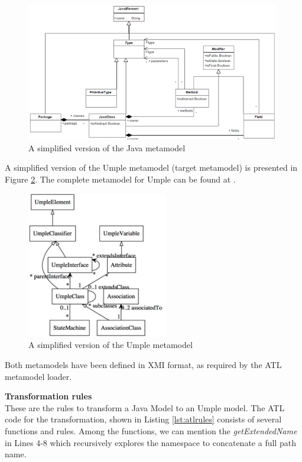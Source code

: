 \begin{figure}[h]
\centering
\includegraphics[width=0.99\textwidth]{Figures/javametamodel.png} 
\caption{A simplified version of the Java metamodel}
\label{fig:javamodelatl}
\end{figure}

A simplified version of the Umple metamodel (target metamodel) is presented in Figure \ref{fig:umplemodelatl}. The complete metamodel for Umple can be found at \cite{UmpleMetamodel}.

\begin{figure}[h]
\centering
\includegraphics[width=0.55\textwidth]{Figures/umpleMetamodel.png} 
\caption{A simplified version of the Umple metamodel}
\label{fig:umplemodelatl}
\end{figure}

Both metamodels have been defined in XMI format, as required by the ATL metamodel loader.

\textbf{Transformation rules} \\

These are the rules to transform a Java Model to an Umple model. The ATL code for the transformation, shown in Listing \ref{lst:atlrules} consists of several functions and rules. Among the functions, we can mention the \textit{getExtendedName} in Lines 4-8 which recursively explores the namespace to concatenate a full path name.

